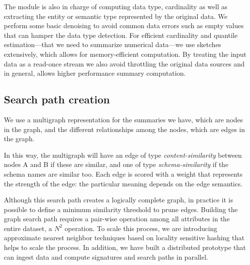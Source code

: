 The module is also in charge of computing data type, cardinality as well as
extracting the entity or semantic type represented by the original data. We
perform some basic denoising to avoid common data errors such as empty values
that can hamper the data type detection. For efficient cardinality and quantile
estimation---that we need to summarize numerical data---we use sketches
extensively, which allows for memory-efficient computation. By treating the
input data as a read-once stream we also avoid throttling the original data
sources and in general, allows higher performance summary computation.





\subsection{Search path creation}
We use a multigraph representation for the summaries we have, which are nodes in the graph, and the different relationships among the nodes, which are edges in the graph. 

In this way, the multigraph will have an edge of type
\emph{content-similarity} between nodes A and B if these are similar, and one of
type \emph{schema-similarity} if the schema names are similar too. Each edge is
scored with a weight that represents the strength of the edge: the particular
meaning depends on the edge semantics.

Although this search path creates a logically complete graph, in practice it is
possible to define a minimum similarity threshold to prune edges. Building the
graph search path requires a pair-wise operation among all attributes in the
entire dataset, a $N^2$ operation. To scale this process, we are introducing
approximate nearest neighbor techniques based on locality sensitive hashing \cite{DBLP:conf/compgeom/DatarIIM04}
that helps to scale the process. In addition, we have built a distributed
prototype that can ingest data and compute signatures and search paths in
parallel.


